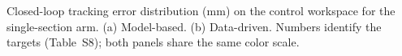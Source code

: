 \caption{Closed-loop tracking error distribution (mm) on the control workspace for the single-section arm. (a) Model-based. (b) Data-driven. Numbers identify the targets (Table~S8); both panels share the same color scale.}
